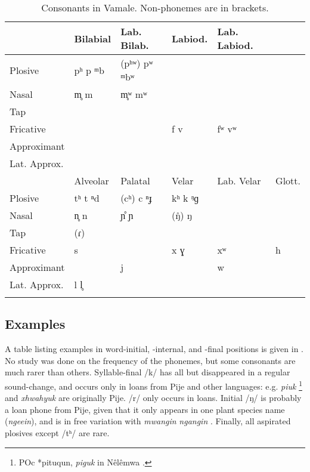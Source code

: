 	\begin{table}
		\caption{Consonants in Vamale. Non-phonemes are in brackets.}
		\begin{tabular}{ *6{l} }
			\lsptoprule
			             & Bilabial & Lab. Bilab. & Labiod. & Lab. Labiod. \\\midrule
			Plosive      & pʰ p ᵐb & (pʰʷ) pʷ ᵐbʷ &         &              \\
			Nasal        & m̥ m     & m̥ʷ mʷ        &         &            \\
			Tap          &         &              &         &              \\
			Fricative    &         &              & f v     & fʷ vʷ        \\
			Approximant  &         &              &         &              \\
			Lat. Approx. &         &              &         &              \\\midrule
			             & Alveolar & Palatal & Velar & Lab. Velar & Glott. \\\midrule
             Plosive     & tʰ t ⁿd & (cʰ) c ⁿɟ & kʰ k ᵑɡ  &    &  \\
             Nasal       & n̥ n     & ɲ̊ ɲ       & (ŋ̊) ŋ    &    &  \\
             Tap         & (ɾ)     &           &          &    &  \\
             Fricative   & s       &           & x ɣ      & xʷ & h \\
             Approximant &         & j         &          & w  &  \\
             Lat. Approx.& l l̥     &           &          &    &\\
			\lspbottomrule
		\end{tabular}
		\label{tab:cons}
	\end{table}

	\subsection{Examples}
	A table listing examples in word-initial, -internal, and -final positions is given in . No study was done on the frequency of the phonemes, but some consonants are much rarer than others. Syllable-final /k/ has all but disappeared in a regular sound-change, and occurs only in loans from Pije and other languages: e.g. \textit{piuk} \footnote{POc *pituqun, \textit{piguk}  in Nêlêmwa \parencite[21]{bril_nelemwa_2002}.} and \textit{xhwahyuk}  are originally Pije. %
	/r/ only occurs in loans. Initial /ŋ/ is probably a loan phone from Pije, given that it only appears in one plant species name (\textit{ngeein}), and is in free variation with \textit{mwangin} \goodtilde \textit{ngangin} . Finally, all aspirated plosives except /tʰ/ are rare.
	
